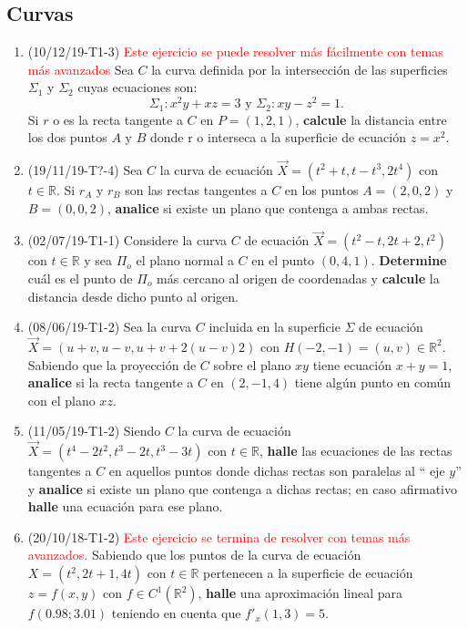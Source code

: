 \documentclass[12pt,a4paper]{article}
\renewcommand{\b}[1]{\textbf{#1}}
\newcommand{\red}[1]{\textcolor{red}{#1}}
\newcommand{\R}{\mathbb{R}}
\begin{document}
\subsection{Curvas}
\begin{enumerate}
	\item (10/12/19-T1-3) \red{Este ejercicio se puede resolver más fácilmente con temas más avanzados} Sea $C$ la curva definida por la intersección de las superficies $\Sigma_1$ y $\Sigma_2$ cuyas ecuaciones son:
	\[\Sigma_1 : x^2 y + x z = 3 \text{  y  } \Sigma_2 : x y - z^2 = 1.\]
	Si \(r\) o es la recta tangente a \(C\) en \(P = ( 1, 2, 1 )\), \b{calcule}  la distancia entre los dos puntos \(A\) y \(B\) donde	r o interseca a la superficie de ecuación \(z = x^2 \).
	
	\item (19/11/19-T?-4) Sea $ C $ la curva de ecuación $ \vec{X} = ( t^2 + t, t - t^3, 2 t^4 ) $ con $ t\in \R $. Si $ r_A $ y $ r_B $ son las rectas tangentes a $ C $ en los puntos $ A = ( 2, 0, 2 ) $ y $ B = ( 0, 0, 2 ) $, \b{analice} si existe un plano que contenga a ambas rectas.
	
	\item (02/07/19-T1-1) Considere la curva $ C $ de ecuación $ \vec{X} = ( t^2 - t, 2 t + 2, t^2)$ con $ t\in \R$ y sea $ \Pi_o $ el plano normal a $ C $ en el punto $ ( 0, 4, 1 )  $. \b{Determine} cuál es el punto de $ \Pi_o $ más cercano al origen de coordenadas y \b{calcule}  la distancia desde dicho punto al origen.
	
	\item (08/06/19-T1-2) Sea la curva $ C $ incluida en la superficie $ \Sigma $ de ecuación $\vec{X} = ( u + v, u - v, u + v + 2 ( u - v ) 2 )$ con $ H ( -2, -1 ) =	( u, v ) \in\R^2  $. Sabiendo que la proyección de $ C $ sobre el plano $ xy $ tiene ecuación $ x + y = 1 $, \b{analice} si la recta tangente a $ C $ en $ ( 2, - 1, 4 ) $ tiene algún punto en común con el plano $ xz  $.
	
	\item (11/05/19-T1-2) Siendo $ C $ la curva de ecuación $ \vec{X} = ( t^4 - 2 t^2, t^3 - 2 t, t^3 - 3 t ) $ con $ t \in\R$, \b{halle} las ecuaciones de las	rectas tangentes a $ C $ en aquellos puntos donde dichas rectas son paralelas al “ eje $ y $” y \b{analice} si existe un plano que contenga a dichas rectas; en caso afirmativo \b{halle} una ecuación para ese plano.
	
	\item (20/10/18-T1-2) \red{Este ejercicio se termina de resolver con temas más avanzados.} Sabiendo que los puntos de la curva de ecuación $ X = ( t^2, 2 t + 1, 4 t ) $ con $ t\in\R $ pertenecen a la superficie de ecuación $ z = f ( x, y ) $ con $ f \in C^1 ( \R^2 )$, \b{halle} una aproximación lineal para $ f(0.98 ; 3.01)$ teniendo en cuenta que $ f'_x( 1, 3 ) = 5  $.
	

\end{enumerate}
\end{document}

